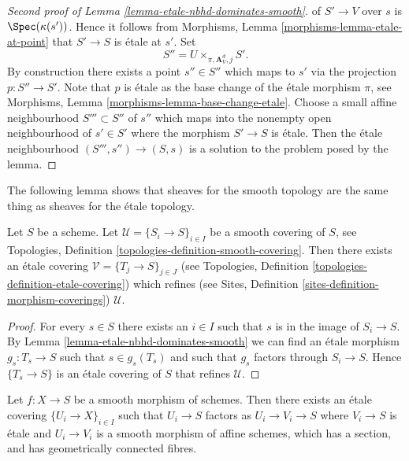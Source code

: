 \begin{proof}[Second proof of Lemma \ref{lemma-etale-nbhd-dominates-smooth}]
of $S' \to V$ over $s$ is $\Spec(\kappa(s'))$. Hence it follows from
Morphisms, Lemma \ref{morphisms-lemma-etale-at-point}
that $S' \to S$ is \'etale at $s'$. Set
$$
S'' = U \times_{\pi, \mathbf{A}^d_V, j} S'.
$$
By construction there exists a point $s'' \in S''$ which maps to
$s'$ via the projection $p : S'' \to S'$. Note that $p$ is \'etale
as the base change of the \'etale morphism $\pi$, see
Morphisms, Lemma \ref{morphisms-lemma-base-change-etale}.
Choose a small affine neighbourhood $S''' \subset S''$ of $s''$
which maps into the nonempty open neighbourhood of $s' \in S'$
where the morphism $S' \to S$ is \'etale. Then the \'etale neighbourhood
$(S''', s'') \to (S, s)$ is a solution to the problem posed by the lemma.
\end{proof}

\noindent
The following lemma shows that sheaves for the smooth topology are
the same thing as sheaves for the \'etale topology.

\begin{lemma}
\label{lemma-etale-dominates-smooth}
Let $S$ be a scheme. Let $\mathcal{U} = \{S_i \to S\}_{i \in I}$ be a smooth
covering of $S$, see
Topologies, Definition \ref{topologies-definition-smooth-covering}.
Then there exists an \'etale covering $\mathcal{V} = \{T_j \to S\}_{j \in J}$
(see
Topologies, Definition \ref{topologies-definition-etale-covering})
which refines (see
Sites, Definition \ref{sites-definition-morphism-coverings})
$\mathcal{U}$.
\end{lemma}

\begin{proof}
For every $s \in S$ there exists an $i \in I$ such that $s$ is in
the image of $S_i \to S$. By
Lemma \ref{lemma-etale-nbhd-dominates-smooth}
we can find an \'etale morphism $g_s : T_s \to S$ such that $s \in g_s(T_s)$
and such that $g_s$ factors through $S_i \to S$. Hence
$\{T_s \to S\}$ is an \'etale covering of $S$ that refines $\mathcal{U}$.
\end{proof}

\begin{lemma}
\label{lemma-cover-smooth-by-special}
Let $f : X \to S$ be a smooth morphism of schemes. Then there exists an
\'etale covering $\{U_i \to X\}_{i \in I}$ such that $U_i \to S$
factors as $U_i \to V_i \to S$ where $V_i \to S$ is \'etale and
$U_i \to V_i$ is a smooth morphism of affine schemes, which
has a section, and has geometrically connected fibres.
\end{lemma}

